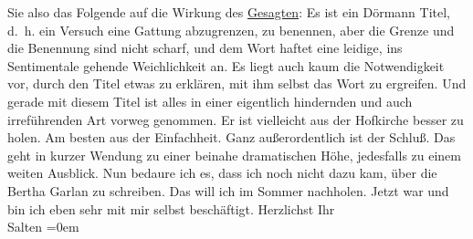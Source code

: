 \begin{ledgroupsized}[t]{13cm}
               Sie also das Folgende auf die Wirkung des \uline{Gesagten}:
               Es ist ein Dörmann Titel, d. h. ein Versuch
               eine Gattung abzugrenzen, zu benennen, aber die Grenze und die Benennung sind nicht
               scharf, und dem Wort haftet eine leidige, ins Sentimentale gehende Weichlichkeit an.
               Es liegt auch kaum die Notwendigkeit vor, durch den Titel etwas zu erklären, mit ihm
               selbst das Wort zu ergreifen. Und gerade mit diesem Titel ist alles in einer
               eigentlich hindernden und auch irreführenden Art vorweg genommen. Er ist vielleicht
               aus der Hofkirche besser zu holen. Am besten
               aus der Einfachheit. Ganz außerordentlich ist der Schluß. Das geht in kurzer Wendung
                  {\pb}zu einer beinahe
               dramatischen Höhe, jedesfalls zu einem weiten Ausblick. Nun bedaure ich es, dass ich
               noch nicht dazu kam, über die Bertha Garlan zu
               schreiben. Das will ich im Sommer nachholen. Jetzt war und bin ich eben sehr mit mir
               selbst beschäftigt. \pend
           \pstart
           Herzlichst Ihr {\\[\baselineskip]}\spacefill\mbox{Salten}\pend
           \leftskip=0em{}
         
         \endnumbering{}\end{ledgroupsized}\begin{anhang}\end{anhang}\newcommand{\dateiname}{L03330}\newcommand{\titel}{Felix Salten an Arthur Schnitzler, 22. 5. 1902}\newcommand{\editorInnen}{Martin Anton Müller und Laura Untner}
      